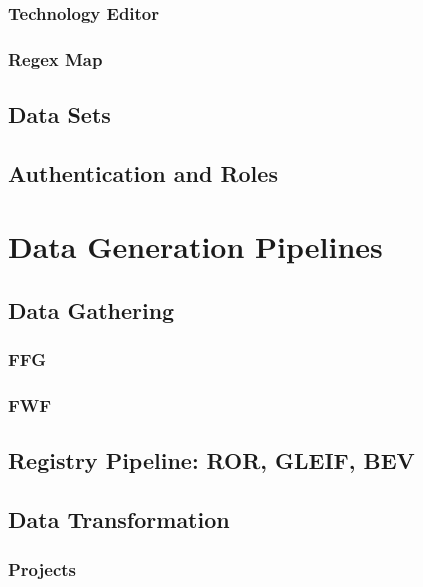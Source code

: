 \subsubsection{Technology Editor}

\subsubsection{Regex Map}

\subsection{Data Sets}

\subsection{Authentication and Roles}

\section{Data Generation Pipelines}


\subsection{Data Gathering}

\subsubsection{FFG}

\subsubsection{FWF}

\subsection{Registry Pipeline: ROR, GLEIF, BEV}

\subsection{Data Transformation}

\subsubsection{Projects}

